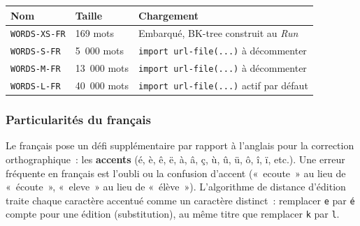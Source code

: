 \documentclass[12pt,a4paper]{article}
\begin{document}
\begin{center}
\begin{tabular}{lll}
  \toprule
  \textbf{Nom} & \textbf{Taille} & \textbf{Chargement} \\
  \midrule
  \texttt{WORDS-XS-FR} & 169 mots  & Embarqué, BK-tree construit au \emph{Run} \\
  \texttt{WORDS-S-FR}  & 5~000 mots  & \texttt{import url-file(...)} à décommenter \\
  \texttt{WORDS-M-FR}  & 13~000 mots & \texttt{import url-file(...)} à décommenter \\
  \texttt{WORDS-L-FR}  & 40~000 mots & \texttt{import url-file(...)} actif par défaut \\
  \bottomrule
\end{tabular}
\end{center}

\subsubsection{Particularités du français}

Le français pose un défi supplémentaire par rapport à l'anglais pour la correction orthographique~: les \textbf{accents} (é, è, ê, ë, à, â, ç, ù, û, ü, ô, î, ï, etc.). Une erreur fréquente en français est l'oubli ou la confusion d'accent («~ecoute~» au lieu de «~écoute~», «~eleve~» au lieu de «~élève~»). L'algorithme de distance d'édition traite chaque caractère accentué comme un caractère distinct~: remplacer \texttt{e} par \texttt{é} compte pour une édition (substitution), au même titre que remplacer \texttt{k} par \texttt{l}.
\end{document}
